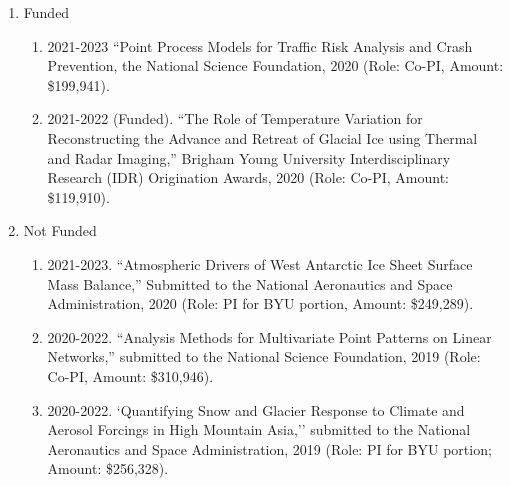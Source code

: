 \documentclass[11pt]{article}
\begin{document}
\begin{enumerate}[label=$\bullet$]
\item Funded
\begin{enumerate}[label=$\cdot$]
\item 2021-2023 ``Point Process Models for Traffic Risk Analysis and Crash Prevention, the National Science Foundation, 2020 (Role: Co-PI, Amount: \$199,941).
\item 2021-2022 (Funded). ``The Role of Temperature Variation for Reconstructing the Advance and Retreat of Glacial Ice using Thermal and Radar Imaging,'' Brigham Young University Interdisciplinary Research (IDR) Origination Awards, 2020 (Role: Co-PI, Amount: \$119,910).

\end{enumerate}
\item Not Funded
\begin{enumerate}[label=$\cdot$]
\item 2021-2023. ``Atmospheric Drivers of West Antarctic Ice Sheet Surface Mass Balance,'' Submitted to the National Aeronautics and Space Administration, 2020 (Role: PI for BYU portion, Amount: \$249,289).
\item 2020-2022. ``Analysis Methods for Multivariate Point Patterns on Linear Networks,'' submitted to the National Science Foundation, 2019 (Role: Co-PI, Amount: \$310,946).
\item 2020-2022. `Quantifying Snow and Glacier Response to Climate and Aerosol Forcings in High Mountain Asia,'' submitted to the National Aeronautics and Space Administration, 2019 (Role: PI for BYU portion; Amount: \$256,328).
\end{enumerate}
\end{enumerate}
\end{document}
